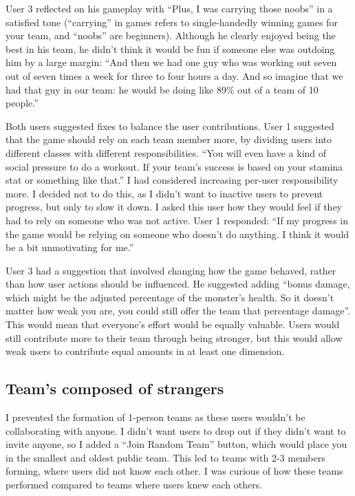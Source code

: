 \documentclass{l4proj}
\begin{document}
User 3 reflected on his gameplay with ``Plus, I was carrying those noobs'' in a satisfied tone (``carrying'' in games refers to single-handedly winning games for your team, and ``noobs'' are beginners). Although he clearly enjoyed being the best in his team, he didn't think it would be fun if someone else was outdoing him by a large margin: ``And then we had one guy who was working out seven out of seven times a week for three to four hours a day. And so imagine that we had that guy in our team: he would be doing like 89\% out of a team of 10 people.'' 

Both users suggested fixes to balance the user contributions. User 1 suggested that the game should rely on each team member more, by dividing users into different classes with different responsibilities. ``You will even have a kind of social pressure to do a workout. If your team's success is based on your stamina stat or something like that.'' I had considered increasing per-user responsibility more. I decided not to do this, as I didn't want to inactive users to prevent progress, but only to slow it down. I asked this user how they would feel if they had to rely on someone who was not active. User 1 responded: ``If my progress in the game would be relying on someone who doesn't do anything. I think it would be a bit unmotivating for me.'' 

User 3 had a suggestion that involved changing how the game behaved, rather than how user actions should be influenced. He suggested adding ``bonus damage, which might be the adjusted percentage of the monster's health. So it doesn't matter how weak you are, you could still offer the team that percentage damage''. This would mean that everyone's effort would be equally valuable. Users would still contribute more to their team through being stronger, but this would allow weak users to contribute equal amounts in at least one dimension. 


\subsection{Team's composed of strangers}
I prevented the formation of 1-person teams as these users wouldn't be collaborating with anyone. I didn't want users to drop out if they didn't want to invite anyone, so I added a ``Join Random Team'' button, which would place you in the smallest and oldest public team. This led to teams with 2-3 members forming, where users did not know each other. I was curious of how these teams performed compared to teams where users knew each others.
\end{document}

